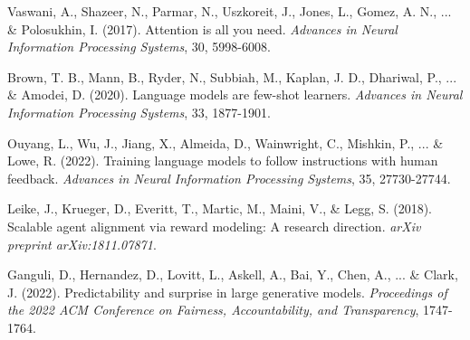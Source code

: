 \documentclass[10pt, a4paper]{article}
\begin{document}



\begin{thebibliography}{9}

Vaswani, A., Shazeer, N., Parmar, N., Uszkoreit, J., Jones, L., Gomez, A. N., ... \& Polosukhin, I. (2017). 
Attention is all you need. 
\textit{Advances in Neural Information Processing Systems}, 30, 5998-6008.

Brown, T. B., Mann, B., Ryder, N., Subbiah, M., Kaplan, J. D., Dhariwal, P., ... \& Amodei, D. (2020). 
Language models are few-shot learners. 
\textit{Advances in Neural Information Processing Systems}, 33, 1877-1901.

Ouyang, L., Wu, J., Jiang, X., Almeida, D., Wainwright, C., Mishkin, P., ... \& Lowe, R. (2022). 
Training language models to follow instructions with human feedback. 
\textit{Advances in Neural Information Processing Systems}, 35, 27730-27744.

Leike, J., Krueger, D., Everitt, T., Martic, M., Maini, V., \& Legg, S. (2018). 
Scalable agent alignment via reward modeling: A research direction. 
\textit{arXiv preprint arXiv:1811.07871}.

Ganguli, D., Hernandez, D., Lovitt, L., Askell, A., Bai, Y., Chen, A., ... \& Clark, J. (2022). 
Predictability and surprise in large generative models. 
\textit{Proceedings of the 2022 ACM Conference on Fairness, Accountability, and Transparency}, 1747-1764.

\end{thebibliography}
\end{document}
